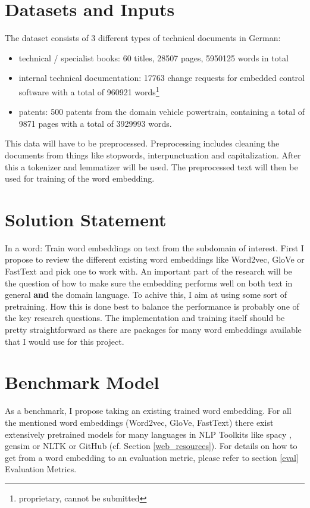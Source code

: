 \documentclass[10pt,a4paper]{article}
\begin{document}
	\section{Datasets and Inputs}
	The dataset consists of 3 different types of technical documents in German:
	\begin{itemize}
		\item technical / specialist books: 60 titles, 28507 pages, 5950125 words in total 
		\item internal technical documentation: 17763 change requests for embedded control software with a total of 960921 words\footnote{proprietary, cannot be submitted} 
		\item patents: 500 patents from the domain vehicle powertrain, containing a total of 9871 pages with a total of 3929993 words.
	\end{itemize}

	This data will have to be preprocessed. Preprocessing includes cleaning the documents from things like stopwords, interpunctuation and capitalization. After this a tokenizer and lemmatizer will be used. The preprocessed text will then be used for training of the word embedding.
	
	\section{Solution Statement}
	In a word: Train word embeddings on text from the subdomain of interest.
	First I propose to review the different existing word embeddings like Word2vec, GloVe or  FastText and pick one to work with. An important part of the research will be the question of how to make sure the embedding performs well on both text in general \textbf{and} the domain language. To achive this, I aim at using some sort of pretraining. How this is done best to balance the performance is probably one of the key research questions.
	The implementation and training itself should be pretty straightforward as there are packages for many word embeddings available that I would use for this project.
	
	\section{Benchmark Model}
	As a benchmark, I propose taking an existing trained word embedding. For all the mentioned word embeddings (Word2vec, GloVe, FastText) there exist extensively pretrained models for many languages in NLP Toolkits like spacy \cite{spacy2}, gensim \cite{rehurek_lrec} or NLTK \cite{Loper:2002:NNL:1118108.1118117} or GitHub (cf. Section \ref{web_resources}). For details on how to get from a word embedding to an evaluation metric, please refer to section \ref{eval} Evaluation Metrics.
	
\end{document}
